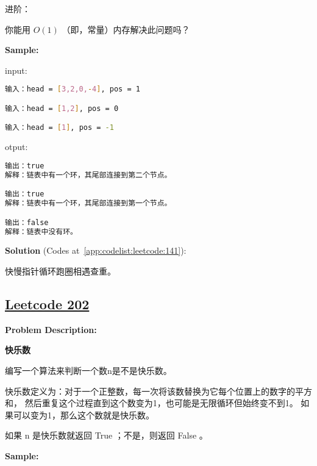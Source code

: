 进阶：\par

你能用 $ O(1) $ （即，常量）内存解决此问题吗？\par


\textbf{Sample:}\par

input:\par

\begin{lstlisting}[language=bash]
输入：head = [3,2,0,-4], pos = 1

输入：head = [1,2], pos = 0

输入：head = [1], pos = -1
\end{lstlisting}

otput:\par

\begin{lstlisting}[language=bash]
输出：true
解释：链表中有一个环，其尾部连接到第二个节点。

输出：true
解释：链表中有一个环，其尾部连接到第一个节点。

输出：false
解释：链表中没有环。
\end{lstlisting}

\textbf{Solution }(Codes at~\ref{app:codelist:leetcode:141}):\par

快慢指针循环跑圈相遇查重。\par



\subsection{\href{https://leetcode-cn.com/}{Leetcode 202}}\label{app:problemlist:leetcode:202}

\textbf{Problem Description:}\par

\textbf{快乐数}\par

编写一个算法来判断一个数n是不是快乐数。\par

快乐数定义为：对于一个正整数，每一次将该数替换为它每个位置上的数字的平方和，
然后重复这个过程直到这个数变为1，也可能是无限循环但始终变不到1。
如果可以变为1，那么这个数就是快乐数。\par

如果 n 是快乐数就返回 True ；不是，则返回 False 。\par


\textbf{Sample:}\par

